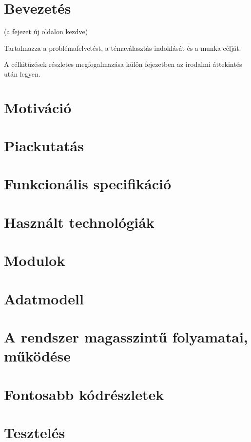 \documentclass[a4paper,12pt]{report}
\theoremstyle{definition}
\theoremstyle{remark}
\begin{document}
\chapter{Bevezetés}

(a fejezet új oldalon kezdve)

Tartalmazza a problémafelvetést, a témaválasztás indoklását és a munka célját.

A célkitűzések részletes megfogalmazása külön fejezetben az irodalmi áttekintés után legyen.



\chapter*{Motiváció}

\chapter*{Piackutatás}

\chapter*{Funkcionális specifikáció}

\chapter*{Használt technológiák}

\chapter*{Modulok}

\chapter*{Adatmodell}

\chapter*{A rendszer magasszintű folyamatai, működése}

\chapter*{Fontosabb kódrészletek}

\chapter*{Tesztelés}
\end{document}

